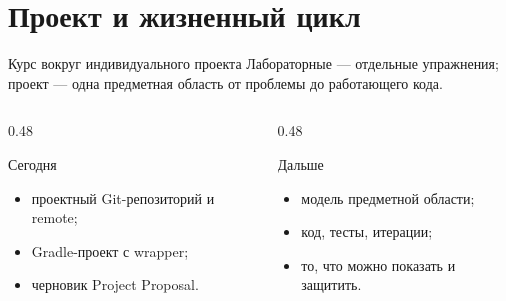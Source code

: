 \section{Проект и жизненный цикл}

\begin{frame}{Курс вокруг индивидуального проекта}
   Лабораторные --- отдельные упражнения;
  проект --- одна предметная область от проблемы до работающего кода.

  \medskip
  \begin{columns}[T]
    \begin{column}{0.48\textwidth}
      \begin{block}{Сегодня}
        \begin{itemize}
          \item проектный Git-репозиторий и remote;
          \item Gradle-проект с wrapper;
          \item черновик Project Proposal.
        \end{itemize}
      \end{block}
    \end{column}
    \begin{column}{0.48\textwidth}
      \begin{block}{Дальше}
        \begin{itemize}
          \item модель предметной области;
          \item код, тесты, итерации;
          \item то, что можно показать и защитить.
        \end{itemize}
      \end{block}
    \end{column}
  \end{columns}
\end{frame}
